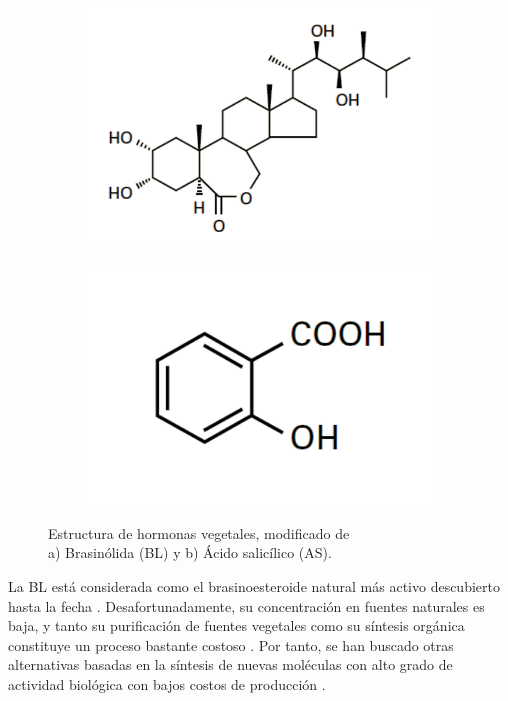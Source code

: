 \begin{figure}[h!!!!]
	\begin{subfigure}{.5\textwidth}
		\centering
		\includegraphics[width=.9\linewidth]{Imagenes/BL}
		\caption{}
		\label{BL}
	\end{subfigure}
	\begin{subfigure}{.4\textwidth}
		\centering
		\includegraphics[width=.8\linewidth]{Imagenes/AS}
		\caption{}
		\label{AS}
	\end{subfigure}
	\caption{Estructura de hormonas vegetales, modificado de \cite{buchanan2015biochemistry} \\ a) Brasin\'olida (BL) y b) \'Acido salic\'ilico (AS).}
	\label{hormonas}
\end{figure}

La BL está considerada como el brasinoesteroide natural más activo descubierto hasta la fecha \citep{grove1979brassinolide}. Desafortunadamente, su concentración en fuentes naturales es baja, y tanto su purificación de fuentes vegetales como su síntesis orgánica constituye un proceso bastante costoso \citep{moreno2018silico}. Por tanto, se han buscado otras alternativas basadas en la síntesis de nuevas moléculas con alto grado de actividad biológica con bajos costos de producción \citep{lei2017structure}.\\

